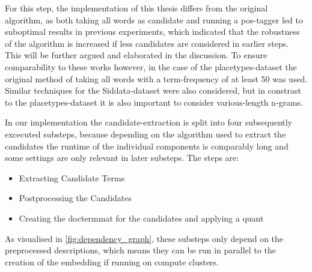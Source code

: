 For this step, the implementation of this thesis differs from the original algorithm, as both taking all words as candidate and running a \gls{pos}-tagger led to suboptimal results in previous experiments, which indicated that the robustness of the algorithm is increased if less candidates are considered in earlier steps. This will be further argued and elaborated in the discussion. To ensure comparability to these works however, in the case of the placetypes-dataset the original method of taking all words with a term-frequency of at least 50 was used. Similar techniques for the Siddata-dataset were also considered, but in constrast to the placetypes-dataset it is also important to consider various-length n-grams. 


In our implementation the candidate-extraction is split into four subsequently excecuted substeps, because depending on the algorithm used to extract the candidates the runtime of the individual components is comparably long and some settings are only relevant in later substeps. The steps are:
\begin{itemize}
	\item Extracting Candidate Terms
	\item Postprocessing the Candidates
	\item Creating the \gls{doctermmat} for the candidates and applying a \gls{quant}
\end{itemize}

As visualised in \autoref{fig:dependency_graph}, these substeps only depend on the preprocessed descriptions, which means they can be run in parallel to the creation of the embedding if \eg running on compute clusters.

